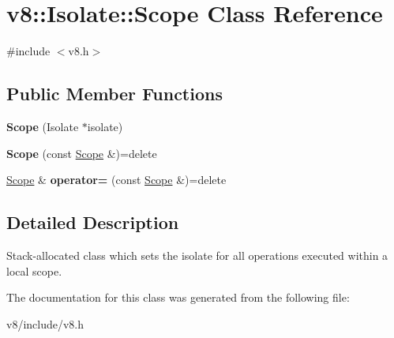 \hypertarget{classv8_1_1Isolate_1_1Scope}{}\section{v8\+:\+:Isolate\+:\+:Scope Class Reference}
\label{classv8_1_1Isolate_1_1Scope}


{\ttfamily \#include $<$v8.\+h$>$}

\subsection*{Public Member Functions}
\begin{DoxyCompactItemize}
\item 
\mbox{\label{classv8_1_1Isolate_1_1Scope_a43889336478a5625e095c4444b9dd684}} 
{\bfseries Scope} (Isolate $\ast$isolate)
\item 
\mbox{\label{classv8_1_1Isolate_1_1Scope_a60cd70c0cf9bb4d65a6ff9fb4719ccde}} 
{\bfseries Scope} (const \mbox{\hyperlink{classv8_1_1Isolate_1_1Scope}{Scope}} \&)=delete
\item 
\mbox{\label{classv8_1_1Isolate_1_1Scope_ad555a0b481e05f004f48beb346025d82}} 
\mbox{\hyperlink{classv8_1_1Isolate_1_1Scope}{Scope}} \& {\bfseries operator=} (const \mbox{\hyperlink{classv8_1_1Isolate_1_1Scope}{Scope}} \&)=delete
\end{DoxyCompactItemize}


\subsection{Detailed Description}
Stack-\/allocated class which sets the isolate for all operations executed within a local scope. 

The documentation for this class was generated from the following file\+:\begin{DoxyCompactItemize}
\item 
v8/include/v8.\+h\end{DoxyCompactItemize}
